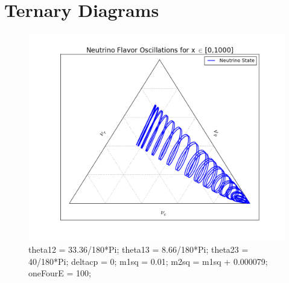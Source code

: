 \documentclass{tufte-handout}
\begin{document}
\section{Ternary Diagrams}



\begin{figure}
\centering
\includegraphics{assets/ternary/1000-1}
\caption{ 
theta12 = 33.36/180*Pi;\newline
theta13 = 8.66/180*Pi;\newline
theta23 = 40/180*Pi;\newline
deltacp = 0;\newline
m1sq = 0.01;\newline
m2sq = m1sq + 0.000079;\newline
oneFourE = 100; 
}
\end{figure}
\end{document}
